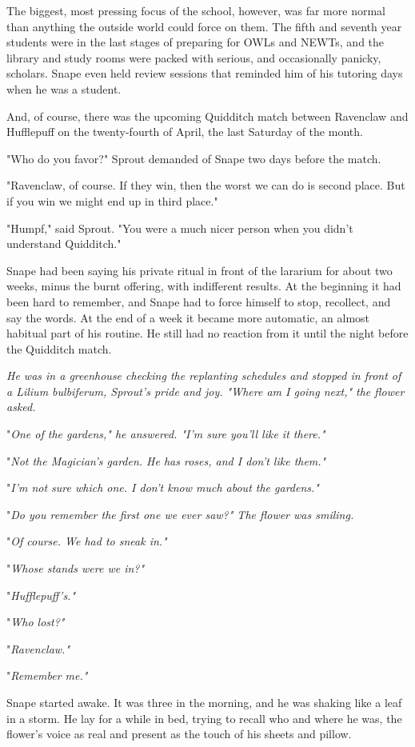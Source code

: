 \documentclass[a4paper,11pt]{article}
\begin{document}
The biggest, most pressing focus of the school, however, was far more normal than anything the outside world could force on them. The fifth and seventh year students were in the last stages of preparing for OWLs and NEWTs, and the library and study rooms were packed with serious, and occasionally panicky, scholars. Snape even held review sessions that reminded him of his tutoring days when he was a student.

And, of course, there was the upcoming Quidditch match between Ravenclaw and Hufflepuff on the twenty-fourth of April, the last Saturday of the month.

"Who do you favor?" Sprout demanded of Snape two days before the match.

"Ravenclaw, of course. If they win, then the worst we can do is second place. But if you win we might end up in third place."

"Humpf," said Sprout. "You were a much nicer person when you didn't understand Quidditch."

Snape had been saying his private ritual in front of the lararium for about two weeks, minus the burnt offering, with indifferent results. At the beginning it had been hard to remember, and Snape had to force himself to stop, recollect, and say the words. At the end of a week it became more automatic, an almost habitual part of his routine. He still had no reaction from it until the night before the Quidditch match.

\emph{He was in a greenhouse checking the replanting schedules and stopped in front of a Lilium bulbiferum, Sprout's pride and joy. "Where am I going next," the flower asked.}

"\emph{One of the gardens," he answered. "I'm sure you'll like it there."}

"\emph{Not the Magician's garden. He has roses, and I don't like them."}

"\emph{I'm not sure which one. I don't know much about the gardens."}

"\emph{Do you remember the first one we ever saw?" The flower was smiling.}

"\emph{Of course. We had to sneak in."}

"\emph{Whose stands were we in?"}

"\emph{Hufflepuff's."}

"\emph{Who lost?"}

"\emph{Ravenclaw."}

"\emph{Remember me."}

Snape started awake. It was three in the morning, and he was shaking like a leaf in a storm. He lay for a while in bed, trying to recall who and where he was, the flower's voice as real and present as the touch of his sheets and pillow.
\end{document}

